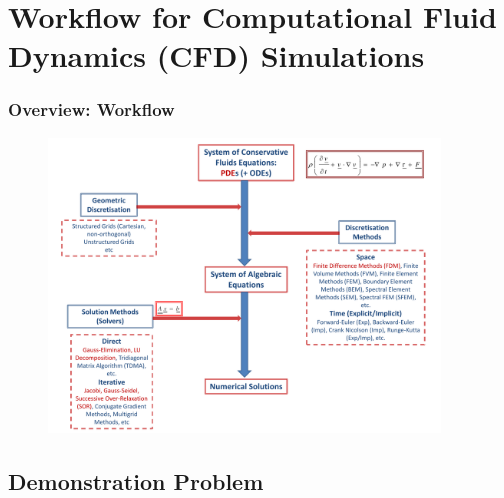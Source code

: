 \documentclass[10pt,compress, unknownkeysallowed]{beamer}
\begin{document}
\section{Workflow for Computational Fluid Dynamics (CFD) Simulations}

\begin{frame}
 \frametitle{Overview: Workflow}

   \begin{figure}%
    \begin{center}
     \includegraphics[width=12.cm, height=7.8cm, clip]{./Figs/CFD_Schematics2.pdf}
    \end{center}
   \end{figure}    

\end{frame}


\subsection{Demonstration Problem}
\end{document}
